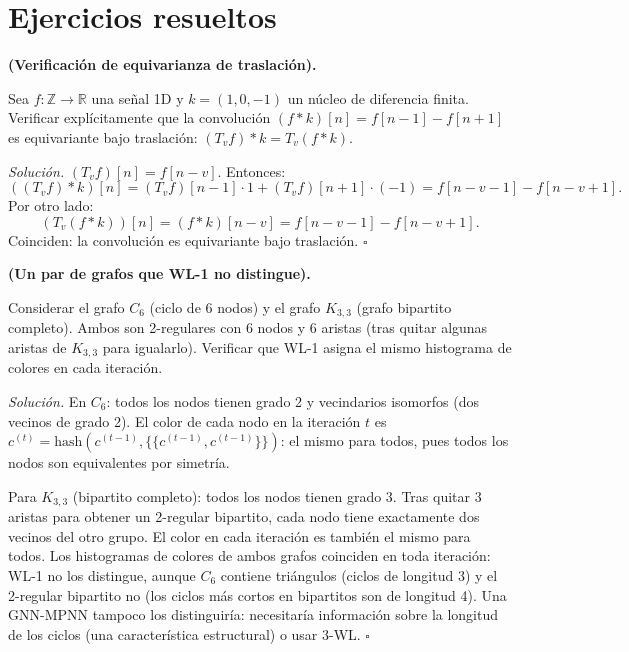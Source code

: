 \section*{Ejercicios resueltos}

\begin{ejercicio}
\label{ej:conv_equivar}
\textbf{(Verificación de equivarianza de traslación).}

Sea $f: \mathbb{Z} \to \mathbb{R}$ una señal 1D y $k = (1, 0, -1)$ un núcleo
de diferencia finita. Verificar explícitamente que la convolución
$(f * k)[n] = f[n-1] - f[n+1]$ es equivariante bajo traslación:
$(T_v f) * k = T_v(f * k)$.

\medskip\noindent\textit{Solución.}
$(T_v f)[n] = f[n-v]$. Entonces:
\[
  ((T_v f)*k)[n]
  = (T_v f)[n-1]\cdot 1 + (T_v f)[n+1]\cdot(-1)
  = f[n-v-1] - f[n-v+1].
\]
Por otro lado:
\[
  (T_v(f*k))[n] = (f*k)[n-v] = f[n-v-1] - f[n-v+1].
\]
Coinciden: la convolución es equivariante bajo traslación. $\square$
\end{ejercicio}

\begin{ejercicio}
\label{ej:wl_falla}
\textbf{(Un par de grafos que WL-1 no distingue).}

Considerar el grafo $C_6$ (ciclo de 6 nodos) y el grafo $K_{3,3}$ (grafo
bipartito completo). Ambos son 2-regulares con 6 nodos y 6 aristas (tras
quitar algunas aristas de $K_{3,3}$ para igualarlo). Verificar que WL-1
asigna el mismo histograma de colores en cada iteración.

\medskip\noindent\textit{Solución.}
En $C_6$: todos los nodos tienen grado 2 y vecindarios isomorfos (dos vecinos
de grado 2). El color de cada nodo en la iteración $t$ es
$c^{(t)} = \mathrm{hash}(c^{(t-1)}, \{\!\{c^{(t-1)}, c^{(t-1)}\}\!\})$:
el mismo para todos, pues todos los nodos son equivalentes por simetría.

Para $K_{3,3}$ (bipartito completo): todos los nodos tienen grado 3. Tras
quitar 3 aristas para obtener un 2-regular bipartito, cada nodo tiene exactamente
dos vecinos del otro grupo. El color en cada iteración es también el mismo para
todos. Los histogramas de colores de ambos grafos coinciden en toda iteración:
WL-1 no los distingue, aunque $C_6$ contiene triángulos (ciclos de longitud 3)
y el 2-regular bipartito no (los ciclos más cortos en bipartitos son de
longitud 4). Una GNN-MPNN tampoco los distinguiría: necesitaría información
sobre la longitud de los ciclos (una característica estructural) o usar 3-WL.
$\square$
\end{ejercicio}

